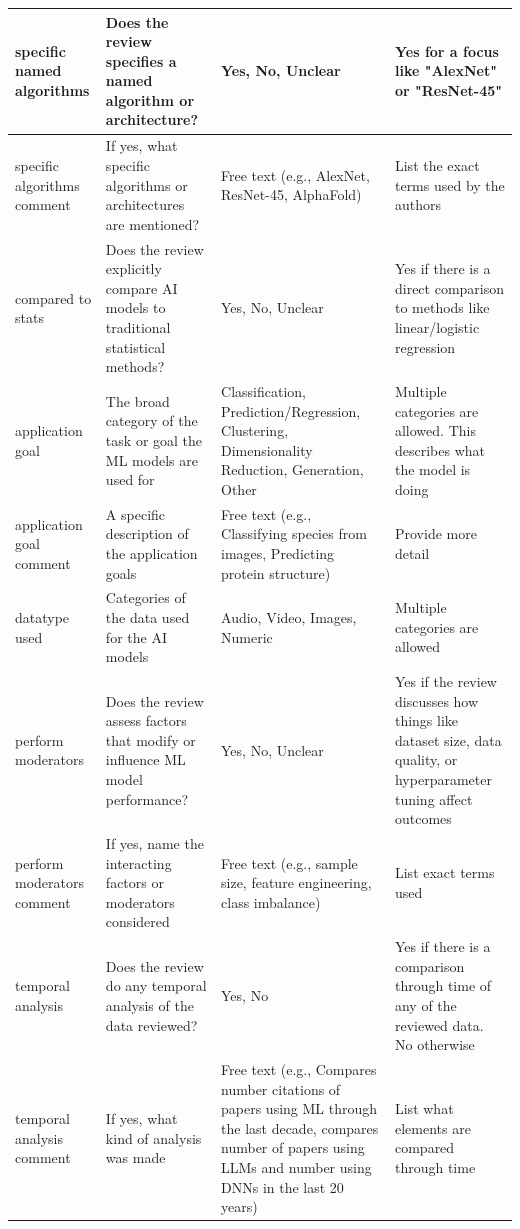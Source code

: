 \documentclass{article}
\begin{document}
\begin{longtable}{p{1.5cm}|p{3cm}|p{3cm}|p{3cm}}
        \hline
        specific named algorithms & Does the review specifies a named algorithm or architecture? & Yes, No, Unclear & Yes for a focus like "AlexNet" or "ResNet-45"\\
        \hline
        specific algorithms comment & If yes, what specific algorithms or architectures are mentioned? & Free text (e.g., AlexNet, ResNet-45, AlphaFold) & List the exact terms used by the authors\\
        \hline
        compared to stats & Does the review explicitly compare AI models to traditional statistical methods? & Yes, No, Unclear & Yes if there is a direct comparison to methods like linear/logistic regression\\
        \hline
        application goal & The broad category of the task or goal the ML models are used for & Classification, Prediction/Regression, Clustering, Dimensionality Reduction, Generation, Other & Multiple categories are allowed. This describes what the model is doing\\
        \hline
        application goal comment & A specific description of the application goals & Free text (e.g., Classifying species from images, Predicting protein structure) & Provide more detail\\
        \hline
        datatype used & Categories of the data used for the AI models & Audio, Video, Images, Numeric & Multiple categories are allowed\\
        \hline
        perform moderators & Does the review assess factors that modify or influence ML model performance? & Yes, No, Unclear & Yes if the review discusses how things like dataset size, data quality, or hyperparameter tuning affect outcomes\\
        \hline
        perform moderators comment & If yes, name the interacting factors or moderators considered & Free text (e.g., sample size, feature engineering, class imbalance) & List exact terms used \\
        \hline
        temporal analysis & Does the review do any temporal analysis of the data reviewed? & Yes, No & Yes if there is a comparison through time of any of the reviewed data. No otherwise\\
        \hline
        temporal analysis comment & If yes, what kind of analysis was made & Free text (e.g., Compares number citations of papers using ML through the last decade, compares number of papers using LLMs and number using DNNs in the last 20 years) & List what elements are compared through time\\

\end{longtable}
\end{document}
